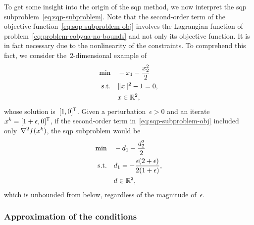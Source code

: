 To get some insight into the origin of the \gls{sqp} method, we now interpret the \gls{sqp} subproblem~\cref{eq:sqp-subproblem}.
Note that the second-order term of the objective function~\cref{eq:sqp-subproblem-obj} involves the Lagrangian function of problem~\cref{eq:problem-cobyqa-no-bounds} and not only its objective function.
It is in fact necessary due to the nonlinearity of the constraints.
To comprehend this fact, we consider the~$2$-dimensional example of \citeauthor{Boggs_Tolle_1995}~\cite{Boggs_Tolle_1995}
\begin{align*}
    \min        & \quad -x_1 - \frac{x_2^2}{2}\\
    \text{s.t.} & \quad \lVert x\rVert^2 - 1 = 0,\\
                & \quad x \in \mathbb{R}^2,
\end{align*}
whose solution is~$[1, 0]^{\mathsf{T}}$.
Given a perturbation~$\epsilon > 0$ and an iterate~$x^k = [1 + \epsilon, 0]^{\mathsf{T}}$, if the second-order term in~\cref{eq:sqp-subproblem-obj} included only~$\nabla^2 f(x^k)$, the \gls{sqp} subproblem would be
\begin{align*}
    \min        & \quad -d_1 - \frac{d_2^2}{2}\\
    \text{s.t.} & \quad d_1 = -\frac{\epsilon (2 + \epsilon)}{2 (1 + \epsilon)},\\
                & \quad d \in \mathbb{R}^2,
\end{align*}
which is unbounded from below, regardless of the magnitude of~$\epsilon$.

\subsubsection{Approximation of the  conditions}

